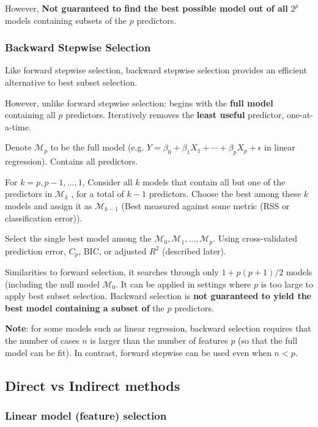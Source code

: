 However, \textbf{Not guaranteed to find the best possible model out of all} $2^p$ models containing subsets of the $p$ predictors.

\subsubsection{Backward Stepwise Selection}

\indent 

Like forward stepwise selection, backward stepwise selection provides an efficient alternative to best subset selection.

However, unlike forward stepwise selection: begins with the \textbf{full model} containing all $p$ predictors. Iteratively removes the \textbf{least useful} predictor, one-at-a-time.

\step Denote $\mathcal{M}_p$ to be the full model (e.g. $Y = \beta_0 + \beta_1X_1+\cdots+\beta_pX_p +\epsilon$ in linear regression). Contains all predictors.

\step For $k = p,p-1,\ldots,1$, Consider all $k$ models that contain all but one of the predictors in $\mathcal{M}_k$ , for a total of $k-1$ predictors. Choose the best among these $k$ models and assign it as $\mathcal{M}_{k-1}$ (Best measured against some metric (RSS or classification error)).

\step Select the single best model among the $\mathcal{M}_0,\mathcal{M}_1,\ldots,\mathcal{M}_p$. Using cross-validated prediction error, $C_p$, BIC, or adjusted $R^2$ (described later).

\bigskip 

Similarities to forward selection, it searches through only $1+p(p+1)/2$ models (including the null model $\mathcal{M}_0$. It can be applied in settings where $p$ is too large to apply best subset selection. Backward selection is \textbf{not guaranteed to yield the best model containing a subset of} the $p$ predictors.

\noindent \textbf{Note}: for some models such as linear regression, backward selection requires that the number of cases $n$ is larger than the number of features $p$ (so that the full model can be fit). In contrast, forward stepwise can be used even when $n <p$.

\subsection{Direct vs Indirect methods}

\subsubsection{Linear model (feature) selection}

